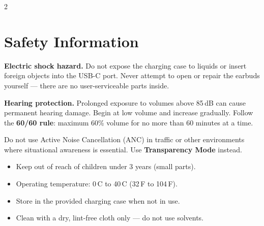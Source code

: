\documentclass[11pt, a4paper]{article}
\begin{document}
\begin{multicols}{2}
\renewcommand{\contentsname}{}
\tableofcontents
\end{multicols}

\bigskip

\section{Safety Information}

\begin{dangerbox}
  \textbf{Electric shock hazard.} Do not expose the charging case to liquids or insert foreign
  objects into the USB-C port. Never attempt to open or repair the earbuds yourself —
  there are no user-serviceable parts inside.
\end{dangerbox}

\vspace{4pt}

\begin{warningbox}
  \textbf{Hearing protection.} Prolonged exposure to volumes above 85\,dB can cause permanent
  hearing damage. Begin at low volume and increase gradually. Follow the \textbf{60/60 rule}:
  maximum 60\% volume for no more than 60 minutes at a time.
\end{warningbox}

\vspace{4pt}

\begin{warningbox}[title={\faCar\enspace\textbf{Traffic Safety}}, colframe=warnborder, coltitle=warnborder]
  Do not use Active Noise Cancellation (ANC) in traffic or other environments where
  situational awareness is essential. Use \textbf{Transparency Mode} instead.
\end{warningbox}

\vspace{4pt}

\begin{itemize}[itemsep=2pt, parsep=0pt, leftmargin=1.4em]
  \item[\faCheckCircle] Keep out of reach of children under 3 years (small parts).
  \item[\faCheckCircle] Operating temperature: 0\,\textdegree{}C to 40\,\textdegree{}C (32\,\textdegree{}F to 104\,\textdegree{}F).
  \item[\faCheckCircle] Store in the provided charging case when not in use.
  \item[\faCheckCircle] Clean with a dry, lint-free cloth only — do not use solvents.
\end{itemize}
\end{document}
